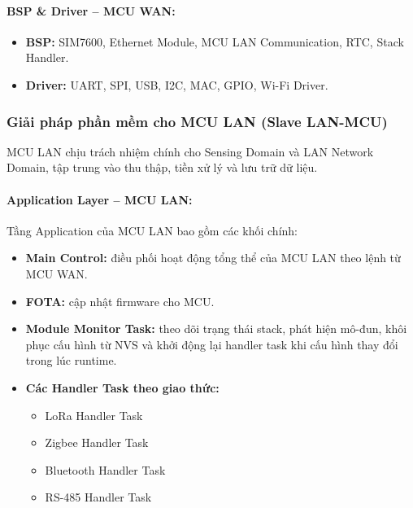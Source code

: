                 \paragraph{BSP \& Driver – MCU WAN:}
                \begin{itemize}
                    \item \textbf{BSP:} SIM7600, Ethernet Module, MCU LAN Communication, RTC, Stack Handler.
                    \item \textbf{Driver:} UART, SPI, USB, I2C, MAC, GPIO, Wi-Fi Driver.
                \end{itemize}

        \subsubsection{Giải pháp phần mềm cho MCU LAN (Slave LAN-MCU)}
            MCU LAN chịu trách nhiệm chính cho Sensing Domain và LAN Network Domain, tập trung vào thu thập, tiền xử lý và lưu trữ dữ liệu.

            \paragraph{Application Layer – MCU LAN:}
                Tầng Application của MCU LAN bao gồm các khối chính:
                \begin{itemize}
                    \item \textbf{Main Control:} điều phối hoạt động tổng thể của MCU LAN theo lệnh từ MCU WAN.
                    \item \textbf{FOTA:} cập nhật firmware cho MCU.
                    \item \textbf{Module Monitor Task:} theo dõi trạng thái stack, phát hiện mô-đun, khôi phục cấu hình từ NVS và khởi động lại handler task khi cấu hình thay đổi trong lúc runtime.
                    \item \textbf{Các Handler Task theo giao thức:}
                    \begin{itemize}
                        \item LoRa Handler Task
                        \item Zigbee Handler Task
                        \item Bluetooth Handler Task
                        \item RS-485 Handler Task
                    \end{itemize}
                \end{itemize}
                
